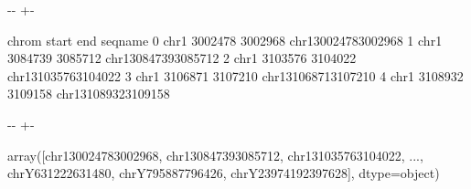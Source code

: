 \documentclass[letterpaper,10pt,english]{sphinxmanual}
\newlength\nbsphinxcodecellspacing
\begin{document}
{

\kern-\sphinxverbatimsmallskipamount\kern-\baselineskip
\kern+\FrameHeightAdjust\kern-\fboxrule
\vspace{\nbsphinxcodecellspacing}

%
\begin{sphinxVerbatim}[commandchars=\\\{\}]
\llap{\color{nbsphinxout}[4]:\,\hspace{\fboxrule}\hspace{\fboxsep}}  chrom    start      end               seqname
0  chr1  3002478  3002968  chr1\PYGZus{}3002478\PYGZus{}3002968
1  chr1  3084739  3085712  chr1\PYGZus{}3084739\PYGZus{}3085712
2  chr1  3103576  3104022  chr1\PYGZus{}3103576\PYGZus{}3104022
3  chr1  3106871  3107210  chr1\PYGZus{}3106871\PYGZus{}3107210
4  chr1  3108932  3109158  chr1\PYGZus{}3108932\PYGZus{}3109158
\end{sphinxVerbatim}
}

{
%
\begin{sphinxVerbatim}[commandchars=\\\{\}]
\llap{\color{nbsphinxin}[6]:\,\hspace{\fboxrule}\hspace{\fboxsep}}
  
\end{sphinxVerbatim}
}

{

\kern-\sphinxverbatimsmallskipamount\kern-\baselineskip
\kern+\FrameHeightAdjust\kern-\fboxrule
\vspace{\nbsphinxcodecellspacing}

%
\begin{sphinxVerbatim}[commandchars=\\\{\}]
\llap{\color{nbsphinxout}[6]:\,\hspace{\fboxrule}\hspace{\fboxsep}}array([\PYGZsq{}chr1\PYGZus{}3002478\PYGZus{}3002968\PYGZsq{}, \PYGZsq{}chr1\PYGZus{}3084739\PYGZus{}3085712\PYGZsq{},
       \PYGZsq{}chr1\PYGZus{}3103576\PYGZus{}3104022\PYGZsq{}, ..., \PYGZsq{}chrY\PYGZus{}631222\PYGZus{}631480\PYGZsq{},
       \PYGZsq{}chrY\PYGZus{}795887\PYGZus{}796426\PYGZsq{}, \PYGZsq{}chrY\PYGZus{}2397419\PYGZus{}2397628\PYGZsq{}], dtype=object)
\end{sphinxVerbatim}
}
\end{document}
